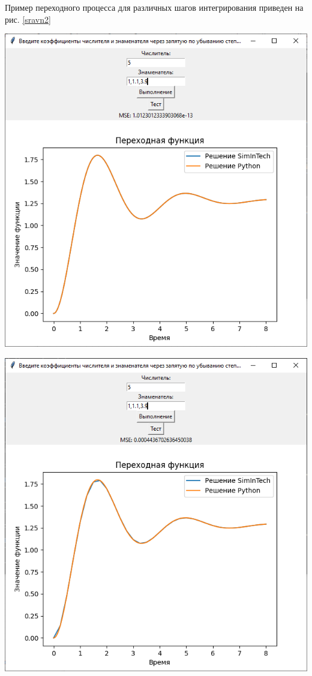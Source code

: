 	Пример переходного процесса для различных шагов интегрирования приведен на рис. \ref{sravn2}
	
	\begin{center}
		\noindent\begin{minipage}{.4\textwidth}
			\includegraphics[width=\textwidth]{png/graph3.png}
		\end{minipage}
		\begin{minipage}{.4\textwidth}
			\includegraphics[width=\textwidth]{png/graph4.png}
		\end{minipage}
		\label{sravn2}	
	\end{center}
	
